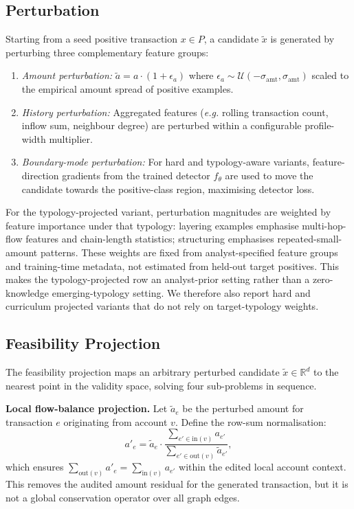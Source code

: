 \documentclass[sigconf,review,anonymous]{acmart}
\newcommand{\eg}{\textit{e.g.}\xspace}
\begin{document}
\subsection{Perturbation}

Starting from a seed positive transaction $x \in P$, a candidate $\tilde{x}$
is generated by perturbing three complementary feature groups:

\begin{enumerate}
\item \textit{Amount perturbation:} $\tilde{a} = a \cdot (1 + \epsilon_a)$
      where $\epsilon_a \sim \mathcal{U}(-\sigma_{\text{amt}}, \sigma_{\text{amt}})$
      scaled to the empirical amount spread of positive examples.
\item \textit{History perturbation:} Aggregated features (\eg rolling
      transaction count, inflow sum, neighbour degree) are perturbed within
      a configurable profile-width multiplier.
\item \textit{Boundary-mode perturbation:} For hard and typology-aware
      variants, feature-direction gradients from the trained detector
      $f_\theta$ are used to move the candidate towards the positive-class
      region, maximising detector loss.
\end{enumerate}

For the typology-projected variant, perturbation magnitudes are weighted
by feature importance under that typology: layering examples emphasise
multi-hop-flow features and chain-length statistics; structuring emphasises
repeated-small-amount patterns.
These weights are fixed from analyst-specified feature groups and training-time
metadata, not estimated from held-out target positives. This makes the
typology-projected row an analyst-prior setting rather than a zero-knowledge
emerging-typology setting. We therefore also report hard and curriculum
projected variants that do not rely on target-typology weights.

\subsection{Feasibility Projection}

The feasibility projection maps an arbitrary perturbed candidate
$\tilde{x} \in \mathbb{R}^d$ to the nearest point in the validity space,
solving four sub-problems in sequence.

\textbf{Local flow-balance projection.}
Let $\tilde{a}_e$ be the perturbed amount for transaction $e$ originating from
account $v$. Define the row-sum normalisation:
\begin{equation}
  a'_e = \tilde{a}_e \cdot \frac{\sum_{e' \in \text{in}(v)} a_{e'}}
                                  {\sum_{e' \in \text{out}(v)} \tilde{a}_{e'}},
  \label{eq:flowbalance}
\end{equation}
which ensures $\sum_{\text{out}(v)} a'_e = \sum_{\text{in}(v)} a_{e'}$
within the edited local account context. This removes the audited amount
residual for the generated transaction, but it is not a global conservation
operator over all graph edges.
\end{document}
